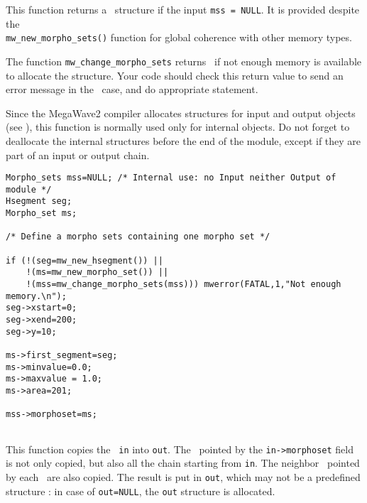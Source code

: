 \Description
This function returns a \msets\ structure if the input \verb+mss = NULL+.
It is provided despite the \\
\verb+mw_new_morpho_sets()+ function for
global coherence with other memory types.

The function \verb+mw_change_morpho_sets+ returns \Null\ if not enough memory is available to allocate the structure. 
Your code should check this return value to send an error message in the \Null\ case, and do appropriate statement.

Since the MegaWave2 compiler allocates structures for input and output 
objects (see \volI), this function is normally used only for internal objects.
Do not forget to deallocate the internal structures before the end
of the module, except if they are part of an input or output chain.

\Next
\Example
\begin{verbatim}
Morpho_sets mss=NULL; /* Internal use: no Input neither Output of module */
Hsegment seg;
Morpho_set ms;

/* Define a morpho sets containing one morpho set */

if (!(seg=mw_new_hsegment()) ||
    !(ms=mw_new_morpho_set()) ||
    !(mss=mw_change_morpho_sets(mss))) mwerror(FATAL,1,"Not enough memory.\n");
seg->xstart=0; 
seg->xend=200;
seg->y=10;

ms->first_segment=seg;
ms->minvalue=0.0;
ms->maxvalue = 1.0;
ms->area=201;

mss->morphoset=ms;


\end{verbatim}

\newpage %


\Description
This function copies the \msets\ \verb+in+ into \verb+out+.
The \mset\ pointed by the \verb+in->morphoset+ field is not only copied, but
also all the chain starting from \verb+in+.
The neighbor \msets\ pointed by each \mset\ are also copied.
The result is put in \verb+out+, which may not be a predefined structure : in case 
of \verb+out=NULL+, the \verb+out+ structure is allocated.

